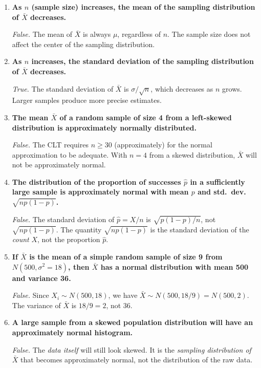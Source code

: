 \documentclass[10pt]{report}
\begin{document}
\begin{enumerate}
  \item \textbf{As $n$ (sample size) increases, the mean of the sampling distribution of $\bar{X}$ decreases.}
  
  \textit{False.} The mean of $\bar{X}$ is always $\mu$, regardless of $n$. The sample size does not affect the center of the sampling distribution.
  
  \item \textbf{As $n$ increases, the standard deviation of the sampling distribution of $\bar{X}$ decreases.}
  
  \textit{True.} The standard deviation of $\bar{X}$ is $\sigma/\sqrt{n}$, which decreases as $n$ grows. Larger samples produce more precise estimates.
  
  \item \textbf{The mean $\bar{X}$ of a random sample of size 4 from a left-skewed distribution is approximately normally distributed.}
  
  \textit{False.} The CLT requires $n \geq 30$ (approximately) for the normal approximation to be adequate. With $n = 4$ from a skewed distribution, $\bar{X}$ will not be approximately normal.
  
  \item \textbf{The distribution of the proportion of successes $\hat{p}$ in a sufficiently large sample is approximately normal with mean $p$ and std.\ dev.\ $\sqrt{np(1-p)}$.}
  
  \textit{False.} The standard deviation of $\hat{p} = X/n$ is $\sqrt{p(1-p)/n}$, not $\sqrt{np(1-p)}$. The quantity $\sqrt{np(1-p)}$ is the standard deviation of the \textit{count} $X$, not the proportion $\hat{p}$.
  
  \item \textbf{If $\bar{X}$ is the mean of a simple random sample of size 9 from $N(500, \sigma^2 = 18)$, then $\bar{X}$ has a normal distribution with mean 500 and variance 36.}
  
  \textit{False.} Since $X_i \sim N(500, 18)$, we have $\bar{X} \sim N(500, 18/9) = N(500, 2)$. The variance of $\bar{X}$ is $18/9 = 2$, not 36.
  
  \item \textbf{A large sample from a skewed population distribution will have an approximately normal histogram.}
  
  \textit{False.} The \textit{data itself} will still look skewed. It is the \textit{sampling distribution of $\bar{X}$} that becomes approximately normal, not the distribution of the raw data.
  

\end{enumerate}
\end{document}
